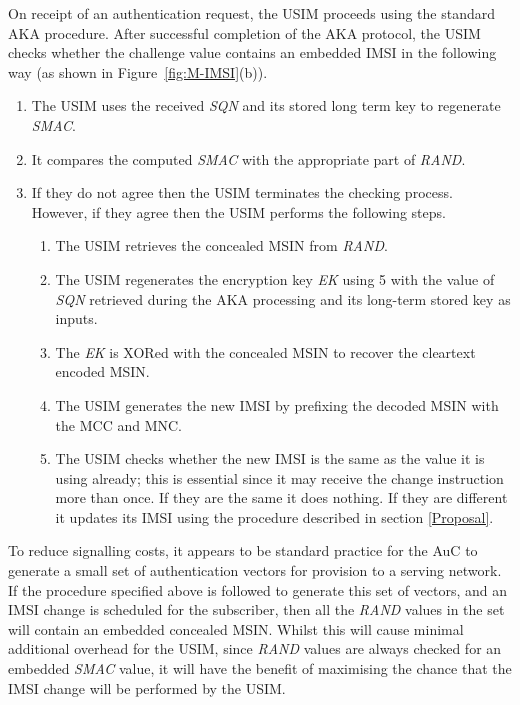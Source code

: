\documentclass{acm_proc_article-sp}
\begin{document}
On receipt of an authentication request, the USIM proceeds using the standard AKA procedure. After successful completion of the AKA protocol, the USIM checks whether the challenge value contains an embedded IMSI in the following way (as shown in Figure~\ref{fig:M-IMSI}(b)). 

\begin{enumerate}

\item The USIM uses the received \emph{SQN} and its stored long term key  to regenerate \emph{SMAC}\@.
\item It compares the computed \emph{SMAC} with the appropriate part of \emph{RAND}\@.
\item If they do not agree then the USIM terminates the checking process. However, if they agree then the USIM performs the following steps.

\begin{enumerate}
	\item The USIM retrieves the concealed MSIN from \emph{RAND}\@. 	
	\item The USIM regenerates the encryption key \emph{EK} using 5 with the value of \emph{SQN} retrieved during the AKA processing and its long-term stored key  as inputs.
	\item The \emph{EK} is XORed with the concealed MSIN to recover the cleartext encoded MSIN.
	\item The USIM generates the new IMSI by prefixing the decoded MSIN with the MCC and MNC.
	\item The USIM checks whether the new IMSI is the same as the value it is using already; this is essential since it may receive the change instruction more than once. If they are the same it does nothing. If they are different it updates its IMSI using the procedure described in section \ref{Proposal}.
	
\end{enumerate} 

\end{enumerate}


To reduce signalling costs, it appears to be standard practice for the AuC to generate a small set of authentication vectors for provision to a serving network. If the procedure specified above is followed to generate this set of vectors, and an IMSI change is scheduled for the subscriber, then all the \emph{RAND} values in the set will contain an embedded concealed MSIN. Whilst this will cause minimal additional overhead for the USIM, since \emph{RAND} values are always checked for an embedded \emph{SMAC} value, it will have the benefit of maximising the chance that the IMSI change will be performed by the USIM. \\
\end{document}
